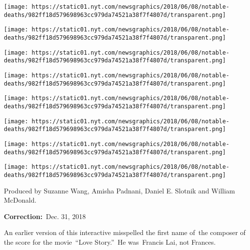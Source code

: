 \texttt{[image: https://static01.nyt.com/newsgraphics/2018/06/08/notable-deaths/982ff18d579698963cc979da74521a38f7f4807d/transparent.png]}

\href{https://www.nytimes.com/2018/01/06/obituaries/jerry-van-dyke-dead.html}{}

\texttt{[image: https://static01.nyt.com/newsgraphics/2018/06/08/notable-deaths/982ff18d579698963cc979da74521a38f7f4807d/transparent.png]}

\href{https://www.nytimes.com/2018/01/06/obituaries/john-young-dead.html}{}

\texttt{[image: https://static01.nyt.com/newsgraphics/2018/06/08/notable-deaths/982ff18d579698963cc979da74521a38f7f4807d/transparent.png]}

\href{https://www.nytimes.com/2018/01/04/obituaries/carmen-cozza-dead-winning-football-coach-at-yale.html}{}

\texttt{[image: https://static01.nyt.com/newsgraphics/2018/06/08/notable-deaths/982ff18d579698963cc979da74521a38f7f4807d/transparent.png]}

\href{https://www.nytimes.com/2018/01/04/obituaries/jimmie-holland-who-cared-for-the-cancer-patients-mind-dies-at-89.html}{}

\texttt{[image: https://static01.nyt.com/newsgraphics/2018/06/08/notable-deaths/982ff18d579698963cc979da74521a38f7f4807d/transparent.png]}

\href{https://www.nytimes.com/2018/01/04/obituaries/aharon-appelfeld-dies.html}{}

\texttt{[image: https://static01.nyt.com/newsgraphics/2018/06/08/notable-deaths/982ff18d579698963cc979da74521a38f7f4807d/transparent.png]}

\href{https://www.nytimes.com/2018/01/03/obituaries/thomas-monson-dies.html}{}

\texttt{[image: https://static01.nyt.com/newsgraphics/2018/06/08/notable-deaths/982ff18d579698963cc979da74521a38f7f4807d/transparent.png]}

\href{https://www.nytimes.com/2018/01/03/obituaries/fred-bass-strand-bookstore-dies-at-89.html}{}

\texttt{[image: https://static01.nyt.com/newsgraphics/2018/06/08/notable-deaths/982ff18d579698963cc979da74521a38f7f4807d/transparent.png]}

Produced by Suzanne Wang, Amisha Padnani, Daniel E. Slotnik and William
McDonald.

\textbf{Correction:}~Dec. 31, 2018

An earlier version of this interactive misspelled the first name of~the
composer of the score for the movie~``Love Story.''~He was~Francis Lai,
not Frances.

